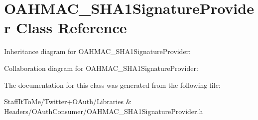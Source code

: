 \hypertarget{interface_o_a_h_m_a_c___s_h_a1_signature_provider}{
\section{\-O\-A\-H\-M\-A\-C\-\_\-\-S\-H\-A1\-Signature\-Provider \-Class \-Reference}
\label{interface_o_a_h_m_a_c___s_h_a1_signature_provider}
}


\-Inheritance diagram for \-O\-A\-H\-M\-A\-C\-\_\-\-S\-H\-A1\-Signature\-Provider\-:


\-Collaboration diagram for \-O\-A\-H\-M\-A\-C\-\_\-\-S\-H\-A1\-Signature\-Provider\-:


\-The documentation for this class was generated from the following file\-:\begin{DoxyCompactItemize}
\item 
\-Staff\-It\-To\-Me/\-Twitter+\-O\-Auth/\-Libraries \& Headers/\-O\-Auth\-Consumer/\-O\-A\-H\-M\-A\-C\-\_\-\-S\-H\-A1\-Signature\-Provider.\-h\end{DoxyCompactItemize}
